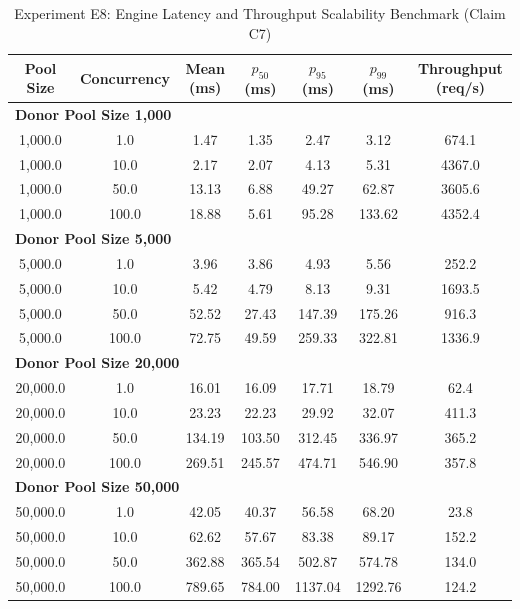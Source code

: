 \begin{table}[t]
\centering
\small
\caption{Experiment E8: Engine Latency and Throughput Scalability Benchmark (Claim C7)}
\label{tab:e8_scalability}
\begin{tabular}{ccccccc}
\toprule
Pool Size & Concurrency & Mean (ms) & $p_{50}$ (ms) & $p_{95}$ (ms) & $p_{99}$ (ms) & Throughput (req/s) \\
\midrule
\multicolumn{7}{l}{\textbf{Donor Pool Size 1,000}} \\
\midrule
1,000.0 & 1.0 & 1.47 & 1.35 & 2.47 & 3.12 & 674.1 \\
1,000.0 & 10.0 & 2.17 & 2.07 & 4.13 & 5.31 & 4367.0 \\
1,000.0 & 50.0 & 13.13 & 6.88 & 49.27 & 62.87 & 3605.6 \\
1,000.0 & 100.0 & 18.88 & 5.61 & 95.28 & 133.62 & 4352.4 \\
\midrule
\multicolumn{7}{l}{\textbf{Donor Pool Size 5,000}} \\
\midrule
5,000.0 & 1.0 & 3.96 & 3.86 & 4.93 & 5.56 & 252.2 \\
5,000.0 & 10.0 & 5.42 & 4.79 & 8.13 & 9.31 & 1693.5 \\
5,000.0 & 50.0 & 52.52 & 27.43 & 147.39 & 175.26 & 916.3 \\
5,000.0 & 100.0 & 72.75 & 49.59 & 259.33 & 322.81 & 1336.9 \\
\midrule
\multicolumn{7}{l}{\textbf{Donor Pool Size 20,000}} \\
\midrule
20,000.0 & 1.0 & 16.01 & 16.09 & 17.71 & 18.79 & 62.4 \\
20,000.0 & 10.0 & 23.23 & 22.23 & 29.92 & 32.07 & 411.3 \\
20,000.0 & 50.0 & 134.19 & 103.50 & 312.45 & 336.97 & 365.2 \\
20,000.0 & 100.0 & 269.51 & 245.57 & 474.71 & 546.90 & 357.8 \\
\midrule
\multicolumn{7}{l}{\textbf{Donor Pool Size 50,000}} \\
\midrule
50,000.0 & 1.0 & 42.05 & 40.37 & 56.58 & 68.20 & 23.8 \\
50,000.0 & 10.0 & 62.62 & 57.67 & 83.38 & 89.17 & 152.2 \\
50,000.0 & 50.0 & 362.88 & 365.54 & 502.87 & 574.78 & 134.0 \\
50,000.0 & 100.0 & 789.65 & 784.00 & 1137.04 & 1292.76 & 124.2 \\
\bottomrule
\end{tabular}
\end{table}
